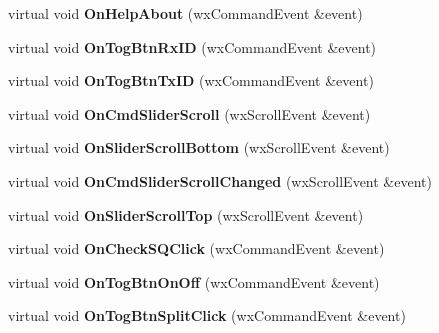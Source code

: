 \begin{DoxyCompactItemize}
\item 
\hypertarget{class_top_frame_ad455667bbd5107f04f82b8ee748d9eb5}{virtual void {\bfseries On\-Help\-About} (wx\-Command\-Event \&event)}\label{class_top_frame_ad455667bbd5107f04f82b8ee748d9eb5}

\item 
\hypertarget{class_top_frame_abecf92c946e342c33afdb164e91dfc74}{virtual void {\bfseries On\-Tog\-Btn\-Rx\-I\-D} (wx\-Command\-Event \&event)}\label{class_top_frame_abecf92c946e342c33afdb164e91dfc74}

\item 
\hypertarget{class_top_frame_aa856acd0a0bc52635485b7ef8a6845d3}{virtual void {\bfseries On\-Tog\-Btn\-Tx\-I\-D} (wx\-Command\-Event \&event)}\label{class_top_frame_aa856acd0a0bc52635485b7ef8a6845d3}

\item 
\hypertarget{class_top_frame_a39dca1a19cf1c237b8021dba4076f2ae}{virtual void {\bfseries On\-Cmd\-Slider\-Scroll} (wx\-Scroll\-Event \&event)}\label{class_top_frame_a39dca1a19cf1c237b8021dba4076f2ae}

\item 
\hypertarget{class_top_frame_a396019a3b0ff107eab1bf80b4f776a18}{virtual void {\bfseries On\-Slider\-Scroll\-Bottom} (wx\-Scroll\-Event \&event)}\label{class_top_frame_a396019a3b0ff107eab1bf80b4f776a18}

\item 
\hypertarget{class_top_frame_a09ae230ed88b1230e42e891e92b95b1d}{virtual void {\bfseries On\-Cmd\-Slider\-Scroll\-Changed} (wx\-Scroll\-Event \&event)}\label{class_top_frame_a09ae230ed88b1230e42e891e92b95b1d}

\item 
\hypertarget{class_top_frame_add7272e7926661e4766572a5f3b39d70}{virtual void {\bfseries On\-Slider\-Scroll\-Top} (wx\-Scroll\-Event \&event)}\label{class_top_frame_add7272e7926661e4766572a5f3b39d70}

\item 
\hypertarget{class_top_frame_a450fef86926774a21a5ea9cff84a5aa0}{virtual void {\bfseries On\-Check\-S\-Q\-Click} (wx\-Command\-Event \&event)}\label{class_top_frame_a450fef86926774a21a5ea9cff84a5aa0}

\item 
\hypertarget{class_top_frame_adf37ba3f68b44511ab4f479482693d17}{virtual void {\bfseries On\-Tog\-Btn\-On\-Off} (wx\-Command\-Event \&event)}\label{class_top_frame_adf37ba3f68b44511ab4f479482693d17}

\item 
\hypertarget{class_top_frame_a497486f3a9da3eb9037575b8a7bd280c}{virtual void {\bfseries On\-Tog\-Btn\-Split\-Click} (wx\-Command\-Event \&event)}\label{class_top_frame_a497486f3a9da3eb9037575b8a7bd280c}


\end{DoxyCompactItemize}
